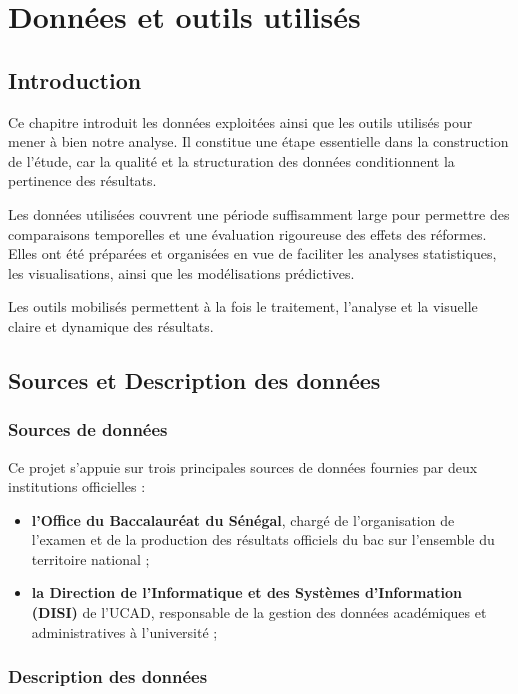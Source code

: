 \chapter{Données et outils utilisés}

\section{Introduction}

Ce chapitre introduit les données exploitées ainsi que les outils utilisés pour mener à bien notre analyse. 
Il constitue une étape essentielle dans la construction de l’étude, car la qualité et la structuration des données conditionnent la pertinence des résultats.

Les données utilisées couvrent une période suffisamment large pour permettre des comparaisons temporelles et une évaluation rigoureuse des effets des réformes. 
Elles ont été préparées et organisées en vue de faciliter les analyses statistiques, les visualisations, ainsi que les modélisations prédictives.

Les outils mobilisés permettent à la fois le traitement, l’analyse et la visuelle claire et dynamique des résultats. 

\section{Sources et Description des données}

\subsection{Sources de données}

Ce projet s’appuie sur trois principales sources de données fournies par deux institutions officielles : 
\begin{itemize}
    \item \textbf{l’Office du Baccalauréat du Sénégal}, chargé de l’organisation de l’examen et de la production des résultats officiels du bac sur l’ensemble du territoire national ;
    \item \textbf{la Direction de l’Informatique et des Systèmes d’Information (DISI)} de l’UCAD, responsable de la gestion des données académiques et administratives à l’université ;
\end{itemize}

\subsection{Description des données}


